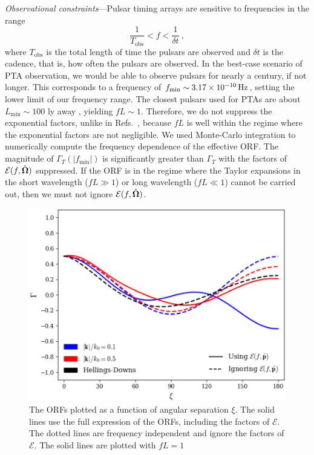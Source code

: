 \documentclass[prd,twocolumn,aps,psfig,nofootinbib,nobibnotes,superscriptaddress,preprintnumbers,times]{revtex4-2}
\newcommand{\Hz}{\,{\rm Hz}}
\begin{document}
\textit{Observational constraints}---Pulsar timing arrays are sensitive to frequencies in the range \cite{Moore:2014lga}
\begin{equation}\label{eq:freqrange}
    \frac{1}{T_{\text{obs}}} < f < \frac{1}{\delta t}\ ,
\end{equation} 
where $T_{\text{obs}}$ is the total length of time the pulsars are observed and $\delta t$ is the cadence, that is, how often the pulsars are observed.  
In the best-case scenario of PTA observation, we would be able to observe pulsars for nearly a century, if not longer. This corresponds to a frequency of $f_{\text{min}} \sim 3.17 \times 10^{-10} \Hz$, setting the lower limit of our frequency range. The closest pulsars used for PTAs are about $L_{\text{min}} \sim 100$ ly away \cite{Anholm:2008wy}, yielding $fL \sim 1$. Therefore, we do not suppress the exponential factors, unlike in Refs.~\cite{Liang:2021bct,Arjona:2024cex}, because $fL$ is well within the regime where the exponential factors are not negligible.
We used Monte-Carlo integration to numerically compute the frequency dependence of the effective ORF. The magnitude of $\Gamma_T(|f_{\text{min}}|)$ is significantly greater than $\Gamma_T$ with the factors of $\mathcal{E}(f, \hat{\bf \Omega})$ suppressed. If the ORF is in the regime where the Taylor expansions in the short wavelength ($fL \gg 1$) or long wavelength ($fL \ll 1$) cannot be carried out, then we must not ignore $\mathcal{E}(f, \hat{\bf \Omega})$.
\begin{figure}[ht]
    \centering
    \includegraphics[scale=0.48]{fig1.pdf}
    \caption{The ORFs plotted as a function of angular separation $\xi$. The solid lines use the full expression of the ORFs, including the factors of $\mathcal{E}$. The dotted lines are frequency independent and ignore the factors of $\mathcal{E}$. The solid lines are plotted with $fL = 1$}
    \label{fig:orfs}
\end{figure}
\end{document}
